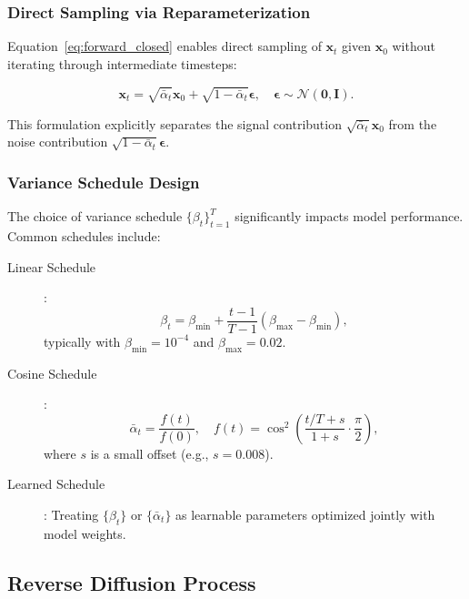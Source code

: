 \documentclass[12pt]{report}
\theoremstyle{definition}
\newcommand{\N}{\mathcal{N}}
\begin{document}
\subsubsection{Direct Sampling via Reparameterization}

Equation~\eqref{eq:forward_closed} enables direct sampling of $\mathbf{x}_t$ given $\mathbf{x}_0$ without iterating through intermediate timesteps:

\begin{equation}
\mathbf{x}_t = \sqrt{\bar{\alpha}_t} \mathbf{x}_0 + \sqrt{1 - \bar{\alpha}_t} \boldsymbol{\epsilon}, \quad \boldsymbol{\epsilon} \sim \N(\mathbf{0}, \mathbf{I}).
\label{eq:xt_reparam}
\end{equation}

This formulation explicitly separates the signal contribution $\sqrt{\bar{\alpha}_t} \mathbf{x}_0$ from the noise contribution $\sqrt{1 - \bar{\alpha}_t} \boldsymbol{\epsilon}$.

\subsubsection{Variance Schedule Design}

The choice of variance schedule $\{\beta_t\}_{t=1}^T$ significantly impacts model performance. Common schedules include:

\begin{description}
\item[Linear Schedule] \citep{ho2020denoising}:
\begin{equation}
\beta_t = \beta_{\min} + \frac{t-1}{T-1}(\beta_{\max} - \beta_{\min}),
\end{equation}
typically with $\beta_{\min} = 10^{-4}$ and $\beta_{\max} = 0.02$.

\item[Cosine Schedule] \citep{nichol2021improved}:
\begin{equation}
\bar{\alpha}_t = \frac{f(t)}{f(0)}, \quad f(t) = \cos^2\left(\frac{t/T + s}{1 + s} \cdot \frac{\pi}{2}\right),
\end{equation}
where $s$ is a small offset (e.g., $s = 0.008$).

\item[Learned Schedule]: Treating $\{\beta_t\}$ or $\{\bar{\alpha}_t\}$ as learnable parameters optimized jointly with model weights.
\end{description}

\subsection{Reverse Diffusion Process}
\end{document}
